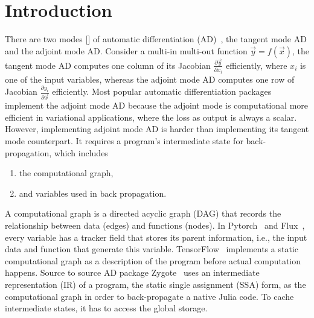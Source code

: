 \documentclass[aps,twocolumn,longbibliography,english,superscriptaddress]{revtex4-1}
\newcommand{\<}{\langle}
\renewcommand{\>}{\rangle}
\newcommand{\vx}{{\vec x}}
\newcommand{\vy}{{\vec y}}
\newcommand{\red}[1]{[{\bf  \color{red}{LW: #1}}]}
\theoremstyle{definition}\newtheorem{definition}{\textit{Definition}}
\begin{document}
\section{Introduction}\label{sec:intro}
    There are two modes \red{not only two, can be mixed. They are just to extremes.} of automatic differentiation (AD)~\cite{Hascoet2013}, the tangent mode AD and the adjoint mode AD.
    Consider a multi-in multi-out function $\vy = f(\vx)$, the tangent mode AD computes one column of its Jacobian $\frac{\partial \vy}{\partial x_i}$ efficiently, where $x_i$ is one of the input variables, whereas the adjoint mode AD computes one row of Jacobian $\frac{\partial y_i}{\partial \vec{x}}$ efficiently.
Most popular automatic differentiation packages implement the adjoint mode AD because the adjoint mode is computational more efficient in variational applications, where the loss as output is always a scalar.
However, implementing adjoint mode AD is harder than implementing its tangent mode counterpart. It requires a program's intermediate state for back-propagation, which includes
\begin{enumerate}
    \item the computational graph,
    \item and variables used in back propagation.
\end{enumerate}
    A computational graph is a directed acyclic graph (DAG) that records the relationship between data (edges) and functions (nodes).
In Pytorch~\cite{Paszke2017} and Flux~\cite{Innes2018a}, every variable has a tracker field that stores its parent information, i.e., the input data and function that generate this variable. TensorFlow~\cite{Tensorflow2015} implements a static computational graph as a description of the program before actual computation happens.
    Source to source AD package Zygote~\cite{Innes2018, Innes2019} uses an intermediate representation (IR) of a program, the static single assignment (SSA) form, as the computational graph in order to back-propagate a native Julia code. To cache intermediate states, it has to access the global storage.
\end{document}
